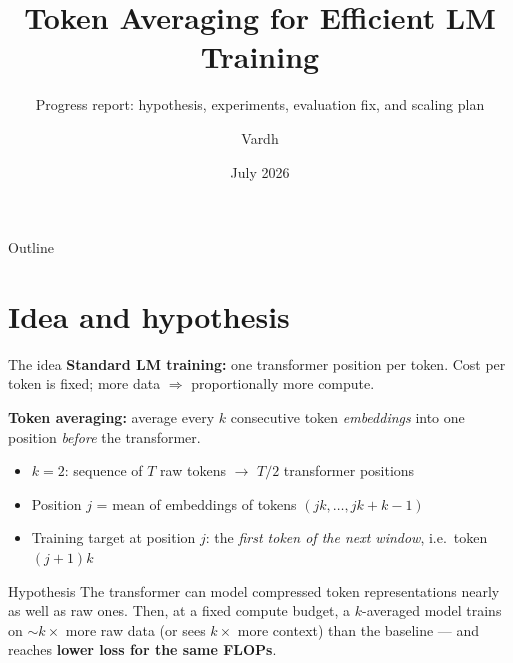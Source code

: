 \documentclass[10pt,aspectratio=169]{beamer}
\title{Token Averaging for Efficient LM Training}
\subtitle{Progress report: hypothesis, experiments, evaluation fix, and scaling plan}
\author{Vardh}
\date{July 2026}
\begin{document}
\maketitle

\begin{frame}{Outline}
  \tableofcontents
\end{frame}

\section{Idea and hypothesis}

\begin{frame}{The idea}
  \textbf{Standard LM training:} one transformer position per token.
  Cost per token is fixed; more data $\Rightarrow$ proportionally more compute.

  \vspace{0.5em}
  \textbf{Token averaging:} average every $k$ consecutive token
  \emph{embeddings} into one position \emph{before} the transformer.
  \begin{itemize}
    \item $k=2$: sequence of $T$ raw tokens $\rightarrow$ $T/2$ transformer positions
    \item Position $j$ = mean of embeddings of tokens $(jk, \dots, jk{+}k{-}1)$
    \item Training target at position $j$: the \emph{first token of the next
          window}, i.e.\ token $(j{+}1)k$
  \end{itemize}

  \vspace{0.5em}
  \begin{block}{Hypothesis}
    The transformer can model compressed token representations nearly as well
    as raw ones. Then, at a fixed compute budget, a $k$-averaged model trains on
    $\sim\!k\times$ more raw data (or sees $k\times$ more context) than the
    baseline --- and reaches \textbf{lower loss for the same FLOPs}.
  \end{block}
\end{frame}
\end{document}
